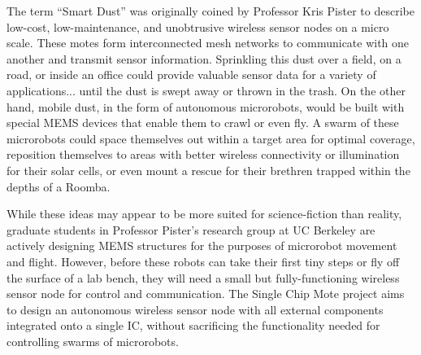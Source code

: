 
The term ``Smart Dust'' was originally coined by Professor Kris Pister to describe low-cost, low-maintenance, and unobtrusive wireless sensor nodes on a micro scale. These motes form interconnected mesh networks to communicate with one another and transmit sensor information. Sprinkling this dust over a field, on a road, or inside an office could provide valuable sensor data for a variety of applications... until the dust is swept away or thrown in the trash. On the other hand, mobile dust, in the form of autonomous microrobots, would be built with special MEMS devices that enable them to crawl or even fly. A swarm of these microrobots could space themselves out within a target area for optimal coverage, reposition themselves to areas with better wireless connectivity or illumination for their solar cells, or even mount a rescue for their brethren trapped within the depths of a Roomba.

While these ideas may appear to be more suited for science-fiction than reality, graduate students in Professor Pister's research group at UC Berkeley are actively designing MEMS structures for the purposes of microrobot movement and flight. However, before these robots can take their first tiny steps or fly off the surface of a lab bench, they will need a small but fully-functioning wireless sensor node for control and communication. The Single Chip Mote project aims to design an autonomous wireless sensor node with all external components integrated onto a single IC, without sacrificing the functionality needed for controlling swarms of microrobots.

